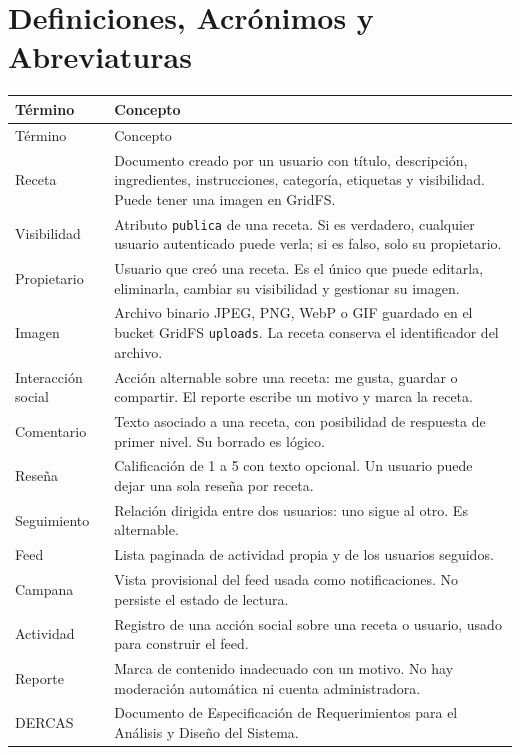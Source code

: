 \chapter{Definiciones, Acrónimos y Abreviaturas}
\label{ch:definiciones}

\begin{center}
\begin{longtable}{p{4.2cm}p{9.3cm}}
  \toprule
  Término & Concepto \\
  \midrule
  \endfirsthead
  \toprule
  Término & Concepto \\
  \midrule
  \endhead
  Receta & Documento creado por un usuario con título, descripción, ingredientes, instrucciones, categoría, etiquetas y visibilidad. Puede tener una imagen en GridFS. \\
  Visibilidad & Atributo \texttt{publica} de una receta. Si es verdadero, cualquier usuario autenticado puede verla; si es falso, solo su propietario. \\
  Propietario & Usuario que creó una receta. Es el único que puede editarla, eliminarla, cambiar su visibilidad y gestionar su imagen. \\
  Imagen & Archivo binario JPEG, PNG, WebP o GIF guardado en el bucket GridFS \texttt{uploads}. La receta conserva el identificador del archivo. \\
  Interacción social & Acción alternable sobre una receta: me gusta, guardar o compartir. El reporte escribe un motivo y marca la receta. \\
  Comentario & Texto asociado a una receta, con posibilidad de respuesta de primer nivel. Su borrado es lógico. \\
  Reseña & Calificación de 1 a 5 con texto opcional. Un usuario puede dejar una sola reseña por receta. \\
  Seguimiento & Relación dirigida entre dos usuarios: uno sigue al otro. Es alternable. \\
  Feed & Lista paginada de actividad propia y de los usuarios seguidos. \\
  Campana & Vista provisional del feed usada como notificaciones. No persiste el estado de lectura. \\
  Actividad & Registro de una acción social sobre una receta o usuario, usado para construir el feed. \\
  Reporte & Marca de contenido inadecuado con un motivo. No hay moderación automática ni cuenta administradora. \\
  DERCAS & Documento de Especificación de Requerimientos para el Análisis y Diseño del Sistema. \\

\end{longtable}
\end{center}
